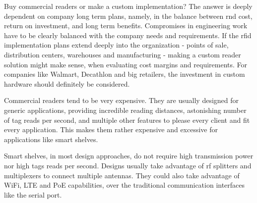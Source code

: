 Buy commercial readers or make a custom implementation?
The answer is deeply dependent on company long term plans, namely, in the balance between \ac{rnd} cost, return on investment, and long term benefits. Compromises in engineering work have to be clearly balanced with the company needs and requirements. If the \ac{rfid} implementation plans extend deeply into the organization - points of sale, distribution centers, warehouses and manufacturing - making a custom reader solution might make sense, when evaluating cost margins and requirements. For companies like Walmart, Decathlon and big retailers, the investment in custom hardware should definitely be considered.

Commercial readers tend to be very expensive. They are usually designed for generic applications, providing incredible reading distances, astonishing number of tag reads per second, and multiple other features to please every client and fit every application.
This makes them rather expensive and excessive for applications like smart shelves.

Smart shelves, in most design approaches, do not require high transmission power nor high tags reads per second. Designs usually take advantage of \ac{rf} splitters and multiplexers to connect multiple antennas. They could also take advantage of WiFi, LTE and PoE capabilities, over the traditional communication interfaces like the serial port.

